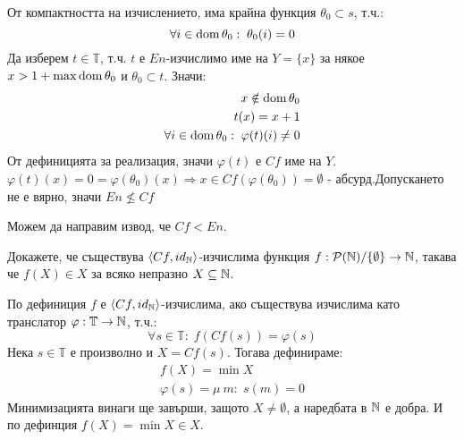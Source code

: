\begin{solution}
\begin{itemize}
              От компактността на изчислението, има крайна функция $\theta_0 \subset s$, т.ч.:
              \begin{equation}
                  \forall i\in \operatorname*{dom}\theta_0:\; \theta_0(i) = 0
              \end{equation}
              Да изберем $t \in \mathbb T$, т.ч. $t$ е $En$-изчислимо име на $Y = \{x\}$ за някое $x > 1 + \max\operatorname*{dom}\theta_0$ и $\theta_0 \subset t$. Значи:
              \begin{equation}
                  \begin{split}
                      x \notin \operatorname*{dom}\theta_0 \\
                      t(x) = x + 1          \\
                      \forall i \in \operatorname*{dom}\theta_0:\; \varphi(t)(i) \neq 0
                  \end{split}
              \end{equation}
              От дефиницията за реализация, значи $\varphi(t)$ е $Cf$ име на $Y$.
              $\varphi(t)(x) = 0 = \varphi(\theta_0)(x) \Rightarrow x \in Cf(\varphi(\theta_0)) = \emptyset$ - абсурд.Допускането не е вярно, значи $En \not\leq Cf$
    \end{itemize}
    Можем да направим извод, че $Cf < En$.
\end{solution}

\begin{problem}
Докажете, че съществува $\langle Cf, id_{\mathbb{N}}\rangle$-изчислима функция $f :\mathcal P({\mathbb{N}}) \slash \{\emptyset\} \to {\mathbb{N}}$, такава че $f(X) \in X$ за всяко непразно $X \subseteq {\mathbb{N}}$.
\end{problem}
\begin{solution}
    По дефиниция $f$ е $\langle Cf, id_{\mathbb{N}}\rangle$-изчислима, ако съществува изчислима като транслатор $\varphi: \mathbb T \to {\mathbb{N}}$, т.ч.:
    \begin{equation}
        \forall s \in \mathbb T:\; f(Cf(s)) = \varphi(s)
    \end{equation}
    Нека $s \in \mathbb T$ е произволно и $X = Cf(s)$. Тогава дефинираме:
    \begin{equation}
        \begin{split}
            f(X) = \min X \\
            \varphi(s) = \mu\ m:\; s(m) = 0
        \end{split}
    \end{equation}
    Минимизацията винаги ще завърши, защото $X \neq \emptyset$, а наредбата в ${\mathbb{N}}$ е добра. И по дефинция $f(X) = \min X \in X$.
\end{solution}

